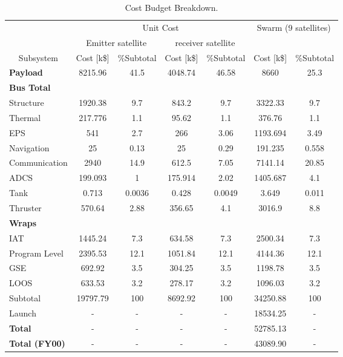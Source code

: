 \begin{table}[ht!]
\centering
\begin{tabular}{l|c|c|c|c|c|c|}
\cline{2-7}
  & \multicolumn{4}{|c|}{Unit Cost} & \multicolumn{2}{|c|}{\multirow{2}{*}{Swarm (9 satellites)}} \\\cline{2-5}
  
  & \multicolumn{2}{|c|}{Emitter satellite} & \multicolumn{2}{|c|}{receiver satellite} & \multicolumn{2}{|c|}{ } \\\hline
  
 \multicolumn{1}{|c|}{Subsystem} & Cost [k\$] & \%Subtotal & Cost [k\$] & \%Subtotal & Cost [k\$] & \%Subtotal \\\hline
 \multicolumn{1}{|l|}{\textbf{Payload}}       & 8215.96 & 41.5 & 4048.74 & 46.58 & 8660 & 25.3 \\\hline
 \multicolumn{7}{|l|}{\textbf{Bus Total}}     \\\hline
 \multicolumn{1}{|l|}{Structure}     & 1920.38 & 9.7 & 843.2 & 9.7 & 3322.33 & 9.7 \\\hline
 \multicolumn{1}{|l|}{Thermal}       & 217.776 & 1.1 & 95.62 & 1.1 & 376.76 & 1.1 \\\hline
 \multicolumn{1}{|l|}{EPS}           & 541 & 2.7 & 266 & 3.06 & 1193.694 & 3.49 \\\hline
 \multicolumn{1}{|l|}{Navigation}    & 25   & 0.13 & 25 & 0.29 & 191.235 & 0.558 \\\hline
 \multicolumn{1}{|l|}{Communication} & 2940 & 14.9 & 612.5 & 7.05 & 7141.14 & 20.85 \\\hline
 \multicolumn{1}{|l|}{\acs{ADCS}}    & 199.093 & 1 & 175.914 & 2.02 & 1405.687 & 4.1 \\\hline
 \multicolumn{1}{|l|}{Tank}          & 0.713 & 0.0036 & 0.428 & 0.0049 & 3.649 & 0.011 \\\hline
 \multicolumn{1}{|l|}{Thruster}      & 570.64  & 2.88 & 356.65  & 4.1 & 3016.9 & 8.8 \\\hline
 \multicolumn{7}{|l|}{\textbf{Wraps}}     \\\hline
 \multicolumn{1}{|l|}{\acs{IAT}}     & 1445.24 & 7.3 & 634.58 & 7.3 & 2500.34 & 7.3 \\\hline
 \multicolumn{1}{|l|}{Program Level} & 2395.53 & 12.1 & 1051.84 & 12.1 & 4144.36 & 12.1 \\\hline
 \multicolumn{1}{|l|}{\acs{GSE}}     & 692.92 & 3.5 & 304.25 & 3.5 & 1198.78 & 3.5 \\\hline
 \multicolumn{1}{|l|}{\acs{LOOS}}    & 633.53 & 3.2 & 278.17 & 3.2 & 1096.03 & 3.2 \\\hline
 \multicolumn{1}{|l|}{Subtotal}      & 19797.79 & 100 & 8692.92 & 100 & 34250.88 & 100 \\\hline
 \multicolumn{1}{|l|}{Launch}        & - & - & - & - & 18534.25 & - \\\hline\hline\hline
 \multicolumn{1}{|l|}{\textbf{Total}}         & - & - & - & - & 52785.13 & - \\\hline
 \multicolumn{1}{|l|}{\textbf{Total (FY00)}}  & - & - & - & - & 43089.90 & - \\\hline
 
\end{tabular}
\caption{Cost Budget Breakdown.}
\label{tab:CB}
\end{table}